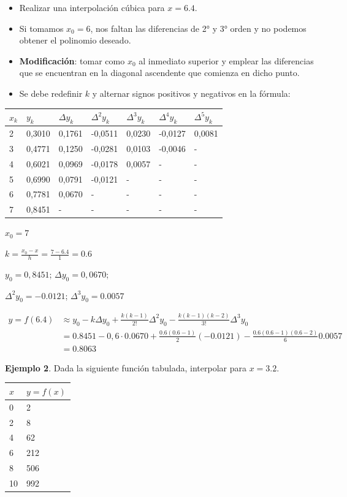 \documentclass[openany]{book}
\providecommand{\tightlist}{%
  \setlength{\itemsep}{0pt}\setlength{\parskip}{0pt}}
\begin{document}
\begin{itemize}
\tightlist
\item
  Realizar una interpolación cúbica para \(x=6.4\).
\item
  Si tomamos \(x_0 = 6\), nos faltan las diferencias de 2° y 3° orden y no podemos obtener el polinomio deseado.
\item
  \textbf{Modificación}: tomar como \(x_0\) al inmediato superior y emplear las diferencias que se encuentran en la diagonal ascendente que comienza en dicho punto.
\item
  Se debe redefinir \(k\) y alternar signos positivos y negativos en la fórmula:
\end{itemize}

\begin{longtable}[]{@{}lllllll@{}}
\toprule
\(x_k\) & \(y_k\) & \(\Delta y_k\) & \(\Delta^2 y_k\) & \(\Delta^3 y_k\) & \(\Delta^4 y_k\) & \(\Delta^5 y_k\)\tabularnewline
\midrule
\endhead
2 & 0,3010 & 0,1761 & -0,0511 & 0,0230 & -0,0127 & 0,0081\tabularnewline
3 & 0,4771 & 0,1250 & -0,0281 & 0,0103 & -0,0046 & -\tabularnewline
4 & 0,6021 & 0,0969 & -0,0178 & 0,0057 & - & -\tabularnewline
5 & 0,6990 & 0,0791 & -0,0121 & - & - & -\tabularnewline
6 & 0,7781 & 0,0670 & - & - & - & -\tabularnewline
7 & 0,8451 & - & - & - & - & -\tabularnewline
\bottomrule
\end{longtable}

\(x_0 = 7\)

\(k = \frac{x_0-x}{h} = \frac{7-6.4}{1} = 0.6\)

\(y_0 = 0,8451\); \(\Delta y_0 = 0,0670\);

\(\Delta^2 y_0 = -0.0121\); \(\Delta^3 y_0 = 0.0057\)

\[
\begin{aligned}
y = f(6.4) &\approx y_0 - k \Delta y_0 + \frac{k(k-1)}{2!}\Delta^2 y_0 - \frac{k(k-1)(k-2)}{3!}\Delta^3 y_0  \\
  & = 0.8451 - 0,6 \cdot 0.0670 + \frac{0.6 (0.6-1)}{2} (-0.0121) - \frac{0.6(0.6-1)(0.6-2)}{6} 0.0057\\
  & = 0.8063
\end{aligned}
\]

\textbf{Ejemplo 2}. Dada la siguiente función tabulada, interpolar para \(x = 3.2\).

\begin{longtable}[]{@{}ll@{}}
\toprule
\(x\) & \(y=f(x)\)\tabularnewline
\midrule
\endhead
0 & 2\tabularnewline
2 & 8\tabularnewline
4 & 62\tabularnewline
6 & 212\tabularnewline
8 & 506\tabularnewline
10 & 992\tabularnewline
\bottomrule
\end{longtable}
\end{document}
